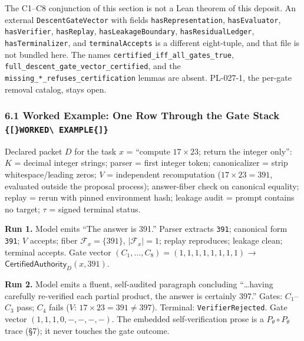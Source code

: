 \documentclass[
  10pt,
]{article}
\DeclareRobustCommand{\texttt}[1]{{\paperSymbolFont\nolinkurl{#1}}}
\begin{document}
The C1--C8 conjunction of this section is not a Lean theorem of this deposit. An external \texttt{DescentGateVector} with fields \texttt{hasRepresentation}, \texttt{hasEvaluator}, \texttt{hasVerifier}, \texttt{hasReplay}, \texttt{hasLeakageBoundary}, \texttt{hasResidualLedger}, \texttt{hasTerminalizer}, and \texttt{terminalAccepts} is a different eight-tuple, and that file is not bundled here. The names \texttt{certified\_iff\_all\_gates\_true}, \texttt{full\_descent\_gate\_vector\_certified}, and the \texttt{missing\_*\_refuses\_certification} lemmas are absent. PL-027-1, the per-gate removal catalog, stays open.

\subsubsection{\texorpdfstring{6.1 Worked Example: One Row Through the Gate Stack \texttt{{[}WORKED\ EXAMPLE{]}}}{6.1 Worked Example: One Row Through the Gate Stack {[}WORKED EXAMPLE{]}}}\label{worked-example-one-row-through-the-gate-stack-worked-example}

Declared packet \protect\hypertarget{math-E0009-0139}{}{\(D\)} for the task \protect\hypertarget{math-E0019-0140}{}{\(x\)} = ``compute \protect\hypertarget{math-E0106-0141}{}{\(17 \times 23\)}; return the integer only'': \protect\hypertarget{math-E0027-0142}{}{\(K\)} = decimal integer strings; parser = first integer token; canonicalizer = strip whitespace/leading zeros; \protect\hypertarget{math-E0012-0143}{}{\(V\)} = independent recomputation (\protect\hypertarget{math-E0107-0144}{}{\(17 \times 23 = 391\)}, evaluated outside the proposal process); answer-fiber check on canonical equality; replay = rerun with pinned environment hash; leakage audit = prompt contains no target; \protect\hypertarget{math-E0014-0145}{}{\(\tau\)} = signed terminal status.

\textbf{Run 1.} Model emits ``The answer is 391.'' Parser extracts \texttt{391}; canonical form \texttt{391}; \protect\hypertarget{math-E0012-0146}{}{\(V\)} accepts; fiber \protect\hypertarget{math-E0108-0147}{}{\(\mathcal F_x = \{391\}\)}, \protect\hypertarget{math-E0109-0148}{}{\(|\mathcal F_x| = 1\)}; replay reproduces; leakage clean; terminal accepts. Gate vector \protect\hypertarget{math-E0110-0149}{}{\((C_1,\dots,C_8) = (1,1,1,1,1,1,1,1)\)} → \protect\hypertarget{math-E0111-0150}{}{\(\mathsf{CertifiedAuthority}_D(x, 391)\)}.

\textbf{Run 2.} Model emits a fluent, self-audited paragraph concluding ``\ldots having carefully re-verified each partial product, the answer is certainly 397.'' Gates: \protect\hypertarget{math-E0112-0151}{}{\(C_1\)}--\protect\hypertarget{math-E0113-0152}{}{\(C_3\)} pass; \protect\hypertarget{math-E0114-0153}{}{\(C_4\)} fails (\protect\hypertarget{math-E0012-0154}{}{\(V\)}: \protect\hypertarget{math-E0115-0155}{}{\(17 \times 23 = 391 \neq 397\)}). Terminal: \texttt{VerifierRejected}. Gate vector \protect\hypertarget{math-E0116-0156}{}{\((1,1,1,0,-,-,-,-)\)}. The embedded self-verification prose is a \protect\hypertarget{math-E0016-0157}{}{\(P_\theta \circ P_\theta\)} trace (§7); it never touches the gate outcome.
\end{document}
